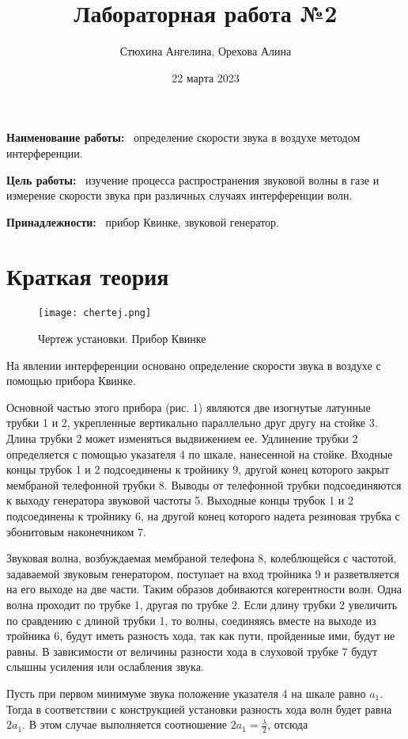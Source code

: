 \documentclass[12pt]{article}
\author{Стюхина Ангелина, Орехова Алина}
\date{22 марта 2023}
\title{Лабораторная работа №2}
\newcommand\field[1]{\noindent\textbf{#1}\ }
\begin{document}
\maketitle

\field{Наименование работы:} определение скорости звука в воздухе методом интерференции.

\field{Цель работы:} изучение процесса распространения звуковой волны в газе и измерение скорости звука при различных случаях интерференции волн.

\field{Принадлежности:} прибор Квинке, звуковой генератор.

\section*{Краткая теория}
\begin{wrapfigure}{r}{0.5\textwidth}
    \centering\texttt{[image: chertej.png]}
    \caption{Чертеж установки. Прибор Квинке}
    \label{fig:oberbeque}
\end{wrapfigure}

На явлении интерференции основано определение скорости звука в воздухе с помощью прибора Квинке.

Основной частью этого прибора (рис. 1) являются две изогнутые латунные трубки 1 и 2, укрепленные вертикально параллельно друг другу на стойке 3. Длина трубки 2 может изменяться выдвижением ее. Удлинение трубки 2 определяется с помощью указателя 4 по шкале, нанесенной на стойке. Входные концы трубок 1 и 2 подсоединены к тройнику 9, другой конец которого закрыт мембраной телефонной трубки 8. Выводы от телефонной трубки подсоединяются к выходу генератора звуковой частоты 5. Выходные концы трубок 1 и 2 подсоединены к тройнику 6, на другой конец которого надета резиновая трубка с эбонитовым наконечником 7.

Звуковая волна, возбуждаемая мембраной телефона 8, колеблющейся с частотой, задаваемой звуковым генератором, поступает на вход тройника 9 и разветвляется на его выходе на две части. Таким образов добиваются когерентности волн. Одна волна проходит по трубке 1, другая по трубке 2. Если длину трубки 2 увеличить по сравдению с длиной трубки 1, то волны, соединяясь вместе на выходе из тройника 6, будут иметь разность хода, так как пути, пройденные ими, будут не равны. В зависимости от величины разности хода в слуховой трубке 7 будут слышны усиления или ослабления звука.

Пусть при первом минимуме звука положение указателя 4 на шкале равно $a_1$. Тогда в соответствии с конструкцией установки разность хода волн будет равна $2a_1$. В этом случае выполняется соотношение $2a_1 = \frac{\lambda}{2}$, отсюда
\end{document}
